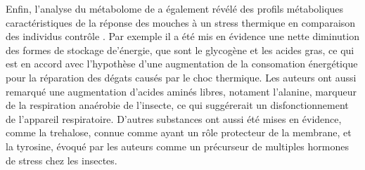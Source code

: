		Enfin, l'analyse du métabolome de  a également révélé des profils métaboliques caractéristiques de la réponse des mouches à un stress thermique en comparaison des individus contrôle \cite{malmendal2006}.
		Par exemple il a été mis en évidence une nette diminution des formes de stockage de'énergie, que sont le glycogène et les acides gras, ce qui est en accord avec l'hypothèse d'une augmentation de la consomation énergétique pour la réparation des dégats causés par le choc thermique.
		Les auteurs ont aussi remarqué une augmentation d'acides aminés libres, notament l'alanine, marqueur de la respiration anaérobie de l'insecte, ce qui suggérerait un disfonctionnement de l'appareil respiratoire.
		D'autres substances ont aussi été mises en évidence, comme la trehalose, connue comme ayant un rôle protecteur de la membrane, et la tyrosine, évoqué par les auteurs comme un précurseur de multiples hormones de stress chez les insectes.

